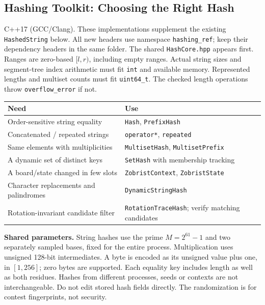 \begingroup
\raggedright
\subsection{Hashing Toolkit: Choosing the Right Hash}
C++17 (GCC/Clang). These implementations supplement the existing
\texttt{HashedString} below. All new headers use namespace
\texttt{hashing\_ref}; keep their dependency headers in the same folder.
The shared \texttt{HashCore.hpp} appears first. Ranges are zero-based
$[l,r)$, including empty ranges. Actual string sizes and segment-tree
index arithmetic must fit \texttt{int} and available memory.
Represented lengths and multiset counts must fit \texttt{uint64\_t}.
The checked length operations throw \texttt{overflow\_error} if not.

\begin{center}
\begin{tabular}{p{}p{}}
\textbf{Need} & \textbf{Use} \\
\hline
Order-sensitive string equality & \texttt{Hash}, \texttt{PrefixHash} \\
Concatenated / repeated strings & \texttt{operator*}, \texttt{repeated} \\
Same elements with multiplicities & \texttt{MultisetHash}, \texttt{MultisetPrefix} \\
A dynamic set of distinct keys & \texttt{SetHash} with membership tracking \\
A board/state changed in few slots & \texttt{ZobristContext}, \texttt{ZobristState} \\
Character replacements and palindromes & \texttt{DynamicStringHash} \\
Rotation-invariant candidate filter & \texttt{RotationTraceHash}; verify matching candidates \\
\end{tabular}
\end{center}

\textbf{Shared parameters.} String hashes use the prime
$M=2^{61}-1$ and two separately sampled bases, fixed for the entire
process. Multiplication uses unsigned 128-bit intermediates.
A byte is encoded as its unsigned value plus one, in $[1,256]$;
zero bytes are supported. Each equality key includes length as well
as both residues. Hashes from different processes, seeds or contexts
are not interchangeable. Do not edit stored hash fields directly.
The randomization is for contest fingerprints, not security.


